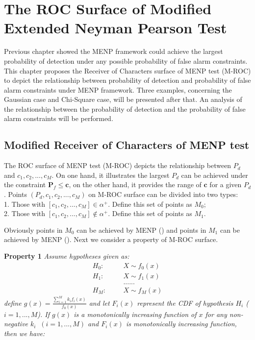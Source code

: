\chapter{The ROC Surface of Modified Extended Neyman Pearson Test}
Previous chapter showed the MENP framework could achieve the largest probability of detection under any possible probability of false alarm constraints. This chapter proposes the Receiver of Characters surface of MENP test (M-ROC) to depict the relationship between probability of detection and probability of false alarm constraints under MENP framework. Three examples,  concerning the Gaussian case and Chi-Square case, will be presented after that. An analysis of the relationship between the probability of detection and the probability of false alarm constraints will be performed. 

\section{Modified Receiver of Characters of MENP test}

The ROC surface of MENP test (M-ROC) depicts the relationship between $P_d$ and $c_1, c_2, ..., c_M$. On one hand, it  illustrates the largest $P_d$ can be achieved under the constraint $\mathbf{P}_{f} \leq \mathbf{c}$, on the other hand, it provides the range of $\mathbf{c}$ for a given $P_d$.
Points $(P_d, c_1, c_2, ..., c_M)$ on M-ROC  surface can be divided into two types: 
\\1. Those with $[c_1, c_2, ..., c_M] \in \alpha^+$. Define this set of points as $M_0$; 
\\2. Those with $[c_1, c_2, ..., c_M] \notin \alpha^+$. Define this set of points as $M_1$. 

Obviously points in $M_0$ can be achieved by MENP () and points in $M_1$ can  be achieved by MENP (). Next we consider a property of M-ROC surface.

\noindent \textbf{Property 1}
\noindent \textit{
  \noindent Assume hypotheses given as:
}
\begin{equation}
\begin{split}
H_0:\;\;\;\;\;\;&X \sim f_0(x)\\
H_1:\;\;\;\;\;\;&X \sim f_1(x)\\
  &......\\
H_M:\;\;\;\;\;\;&X \sim f_M(x)
\end{split}
\end{equation}
\textit{
  define $g(x) = \frac{\sum_{i=1}^{M}k_if_i(x)}{f_0(x)}$ and let $F_i(x)$ represent the CDF of hypothesis $H_i$ ($i = 1, ..., M$). If $g(x)$ is a monotonically increasing function of $x$ for any non-negative $k_i\;\;(i = 1, ..., M)$ and $F_i(x)$ is monotonically increasing function, then we have:}
  
